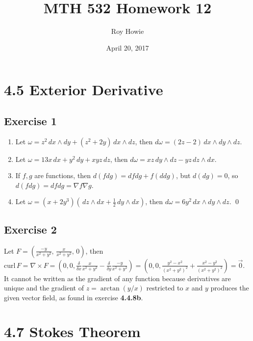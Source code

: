 \documentclass{article}
\newcommand{\wprod}[2]{\,#1\wedge #2}
\newcommand{\wprods}[3]{\,#1\wedge #2\wedge #3}
\begin{document}
\title{\vspace{-2cm}MTH 532 Homework 12}
\author{Roy Howie}
\date{April 20, 2017}
\maketitle

\section*{4.5 Exterior Derivative}
  \subsection*{Exercise 1}
    \begin{enumerate}[label=\textbf{(\alph*)}]
      \item{
        Let $\omega=z^2\,dx\wedge dy+(z^2+2y)\,dx\wedge dz$, then $d\omega=
        (2z-2)\wprods{dx}{dy}{dz}$.
      }
      \item{
        Let $\omega=13x\,dx+y^2\,dy+xyz\,dz$, then $d\omega=xz\wprod{dy}{dz}-yz
        \wprod{dz}{dx}$.
      }
      \item{
        If $f,g$ are functions, then $d(fdg)=dfdg+f(ddg)$, but $d(dg)=0$, so
        $d(fdg)=dfdg=\nabla f\nabla g$.
      }
      \item{
        Let $\omega=(x+2y^3)(\wprod{dz}{dx}+\frac{1}{2}\wprod{dy}{dx})$, then
        $d\omega=6y^2\wprods{dx}{dy}{dz}$.
      }
      \qed
    \end{enumerate}
  \subsection*{Exercise 2}
    Let $F=\left(\frac{-y}{x^2+y^2},\,\frac{x}{x^2+y^2},\,0\right)$, then
    $\text{curl}\,F=\nabla\times F=\left(0,0,\frac{\delta}{\delta x}\frac{x}{x^2
    +y^2}-\frac{\delta}{\delta y}\frac{-y}{x^2+y^2}\right)=\left(0,0,
    \frac{y^2-x^2}{(x^2+y^2)^2}+\frac{x^2-y^2}{(x^2+y^2)^2}\right)=\vec{0}$. It
    cannot be written as the gradient of any function because derivatives are
    unique and the gradient of $z=\arctan(y/x)$ restricted to $x$ and $y$
    produces the given vector field, as found in exercise \textbf{4.4.8b}.

\section*{4.7 Stokes Theorem}
\end{document}
